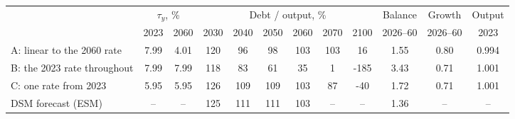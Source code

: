 \begin{tabular}{@{}lccccccccccc@{}}
\toprule
 & \multicolumn{2}{c}{$\tau_y$, \%} & \multicolumn{6}{c}{Debt / output, \%} & {Balance} & {Growth} & {Output} \\
\cmidrule(lr){2-3}\cmidrule(lr){4-9}
 & {2023} & {2060} & {2030} & {2040} & {2050} & {2060} & {2070} & {2100} & {2026--60} & {2026--60} & {2023} \\
\midrule
A: linear to the 2060 rate & 7.99 & 4.01 & 120 & 96 & 98 & 103 & 103 & 16 & 1.55 & 0.80 & 0.994 \\
B: the 2023 rate throughout & 7.99 & 7.99 & 118 & 83 & 61 & 35 & 1 & -185 & 3.43 & 0.71 & 1.001 \\
C: one rate from 2023 & 5.95 & 5.95 & 126 & 109 & 109 & 103 & 87 & -40 & 1.72 & 0.71 & 1.001 \\
DSM forecast (ESM) & {--} & {--} & 125 & 111 & 111 & 103 & {--} & {--} & 1.36 & {--} & {--} \\
\bottomrule
\end{tabular}
